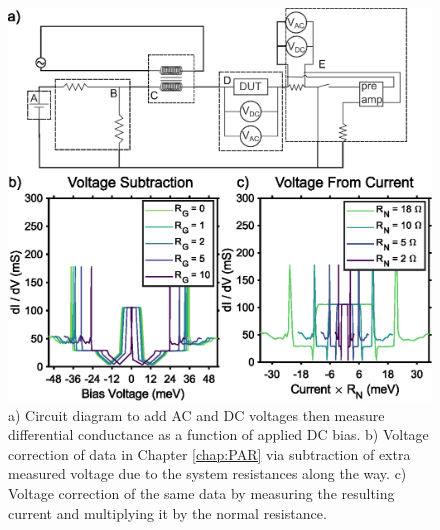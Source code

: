 \begin{figure}
    \centering
    \includegraphics{Appendices/Figures/Circuit.eps}
    \caption{a) Circuit diagram to add AC and DC voltages then measure differential conductance as a function of applied DC bias. b) Voltage correction of data in Chapter \ref{chap:PAR} via subtraction of extra measured voltage due to the system resistances along the way. c) Voltage correction of the same data by measuring the resulting current and multiplying it by the normal resistance.}
    \label{fig:Circuit}
\end{figure}

